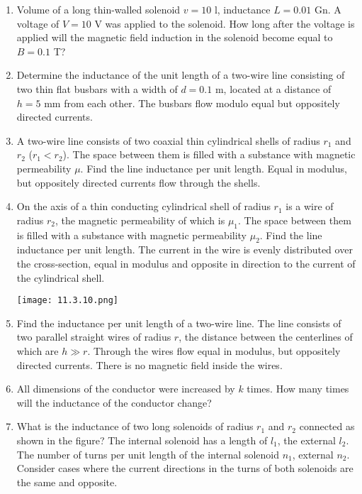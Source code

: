 \documentclass{article}
\begin{document}
\begin{enumerate}[label=11.3.\arabic*]
\item Volume of a long thin-walled solenoid $v = 10$ l, inductance $L = 0.01$ Gn. A voltage of $V = 10$ V was applied to the solenoid. How long after the voltage is applied will the magnetic field induction in the solenoid become equal to $B = 0.1$ T?

\item Determine the inductance of the unit length of a two-wire line consisting of two thin flat busbars with a width of $d = 0.1$ m, located at a distance of $h = 5$ mm from each other. The busbars flow modulo equal but oppositely directed currents.

\item A two-wire line consists of two coaxial thin cylindrical shells of radius $r_1$ and $r_2$ ($r_1 < r_2$). The space between them is filled with a substance with magnetic permeability $\mu$. Find the line inductance per unit length. Equal in modulus, but oppositely directed currents flow through the shells.

\item On the axis of a thin conducting cylindrical shell of radius $r_1$ is a wire of radius $r_2$, the magnetic permeability of which is $\mu_1$. The space between them is filled with a substance with magnetic permeability $\mu_2$. Find the line inductance per unit length. The current in the wire is evenly distributed over the cross-section, equal in modulus and opposite in direction to the current of the cylindrical shell.

\begin{center}
    \texttt{[image: 11.3.10.png]}
\end{center}

\item Find the inductance per unit length of a two-wire line. The line consists of two parallel straight wires of radius $r$, the distance between the centerlines of which are $h \gg r$. Through the wires flow equal in modulus, but oppositely directed currents. There is no magnetic field inside the wires.

\item All dimensions of the conductor were increased by $k$ times. How many times will the inductance of the conductor change?

\item What is the inductance of two long solenoids of radius $r_1$ and $r_2$ connected as shown in the figure? The internal solenoid has a length of $l_1$, the external $l_2$. The number of turns per unit length of the internal solenoid $n_1$, external $n_2$. Consider cases where the current directions in the turns of both solenoids are the same and opposite.


\end{enumerate}
\end{document}
